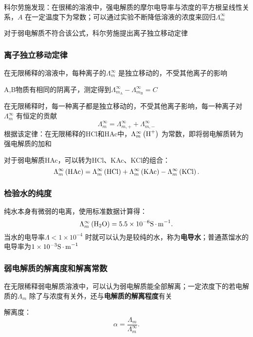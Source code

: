 \begin{notation}
    科尔劳施发现：在很稀的溶液中，强电解质的摩尔电导率与浓度的平方根呈线性关系，$A$ 在一定温度下为常数；可以通过实验不断降低溶液的浓度来回归$\Lambda_{m}^{\infty }$
\end{notation}
对于弱电解质不符合该公式，科尔劳施提出离子独立移动定律
\subsubsection{离子独立移动定律}%
\label{ssub*:离子独立移动定律}
\begin{defi}
    在无限稀释的溶液中，每种离子的$\Lambda_{m}^{\infty }$ 是独立移动的，不受其他离子的影响
\end{defi}
\begin{eg}
    A,B物质有相同的阴离子，测定得到$\Lambda_{m_\text{A}}^{\infty }-\Lambda_{m_\text{B}}^{\infty }=C$
\end{eg}
在无限稀释时，每一种离子都是独立移动的，不受其他离子影响，每一种离子对$\Lambda_{m}^{\infty }$ 有恒定的贡献
\begin{equation}
    \label{eq:kolhrausch}
    \Lambda_{m}^{\infty } = \Lambda_{m,+}^{\infty }+\Lambda_{m,-}^{\infty }
\end{equation}
根据该定律：在无限稀释的HCl和HAc中，$\Lambda_{m}^{\infty }\left( \ce{H+} \right)$ 为常数，即将弱电解质转为强电解质的加和
\begin{eg}
    对于弱电解质HAc，可以转为HCl、KAc、KCl的组合：
    \[
        \Lambda_{m}^{\infty } \left( \ce{HAc} \right) = \Lambda_{m}^{\infty }\left( \ce{HCl} \right)+\Lambda_{m}^{\infty }\left( \ce{KAc} \right)-\Lambda_{m}^{\infty }\left( \ce{KCl} \right)
    .\]
\end{eg}
\subsubsection{检验水的纯度}%
\label{ssub*:检验水的纯度}
纯水本身有微弱的电离，使用标准数据计算得：\[
    \Lambda_{m}^{\infty }\left( \ce{H_2O} \right) = 5.5\times 10^{-6}\ce{S*m^{-1}}
.\]
当水的电导率$\Lambda<1\times 10^{-4}$ 时就可以认为是较纯的水，称为\textbf{电导水}；普通蒸馏水的电导率为$1\times 10^{-3}\ce{S*m^{-1}}$
\subsubsection{弱电解质的解离度和解离常数}%
\label{ssub*:弱电解质的解离度和解离常数}
\begin{notation}
    在无限稀释弱电解质溶液中，可以认为弱电解质能全部解离；一定浓度下的若电解质的$\Lambda_{m}$ 除了与浓度有关外，还与\textbf{电解质的解离程度}有关
\end{notation}
\begin{defi}
    解离度：\[
        \alpha = \frac{\Lambda_{m}}{\Lambda_{m}^{\infty }}
    .\]
\end{defi}
